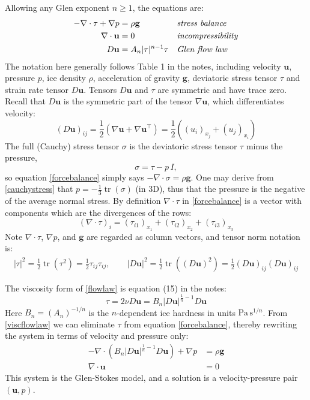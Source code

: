 \documentclass[letterpaper,final,12pt,reqno]{amsart}
\newcommand{\grad}{\nabla}
\newcommand{\Div}{\nabla\cdot}
\newcommand{\trace}{\operatorname{tr}}
\newcommand{\bg}{\mathbf{g}}
\newcommand{\bu}{\mathbf{u}}
\begin{document}
Allowing any Glen exponent $n\ge 1$, the equations are:
\begin{align}
- \nabla \cdot \tau + \nabla p &= \rho \bg &&\text{\emph{stress balance}} \label{forcebalance} \\
\nabla \cdot \bu &= 0 &&\text{\emph{incompressibility}} \label{incompressible} \\
D\bu &= A_n |\tau|^{n-1} \tau &&\text{\emph{Glen flow law}} \label{flowlaw}
\end{align}
The notation here generally follows Table 1 in the notes, including velocity $\bu$, pressure $p$, ice density $\rho$, acceleration of gravity $\bg$, deviatoric stress tensor $\tau$ and strain rate tensor $D\bu$.  Tensors $D\bu$ and $\tau$ are symmetric and have trace zero.  Recall that $D\bu$ is the symmetric part of the tensor $\grad \bu$, which differentiates velocity:
\begin{equation}
(D\bu)_{ij} = \frac{1}{2} \left(\grad\bu + \grad\bu^\top\right) = \frac{1}{2} \left((u_i)_{x_j} + (u_j)_{x_i}\right) \label{strainrate}
\end{equation}
The full (Cauchy) stress tensor $\sigma$ is the deviatoric stress tensor $\tau$ minus the pressure,
\begin{equation}
    \sigma = \tau - p\,I,  \label{cauchystress}
\end{equation}
so equation \eqref{forcebalance} simply says $-\Div \sigma = \rho \bg$.  One may derive from \eqref{cauchystress} that $p = -\frac{1}{3} \trace(\sigma)$ (in 3D), thus that the pressure is the negative of the average normal stress.  By definition $\Div\tau$ in \eqref{forcebalance} is a vector with components which are the divergences of the rows:
\begin{equation}
    \left(\nabla \cdot \tau\right)_i = \left(\tau_{i1}\right)_{x_1} + \left(\tau_{i2}\right)_{x_2} + \left(\tau_{i3}\right)_{x_3}  \label{divtaudefn}
\end{equation}
Note $\nabla\cdot \tau$, $\nabla p$, and $\bg$ are regarded as column vectors, and tensor norm notation is:
\begin{align*}
|\tau|^2 = \frac{1}{2} \trace\left(\tau^2\right) = \frac{1}{2} \tau_{ij} \tau_{ij}, \qquad |D\bu|^2 = \frac{1}{2} \trace\left((D\bu)^2\right) = \frac{1}{2} (D\bu)_{ij} (D\bu)_{ij}
\end{align*}

The viscosity form of \eqref{flowlaw} is equation (15) in the notes:
\begin{equation}
\tau = 2\nu D\bu = B_n |D\bu|^{\frac{1}{n} - 1} D\bu  \label{viscflowlaw}
\end{equation}
Here $B_n = (A_n)^{-1/n}$ is the $n$-dependent ice hardness in units $\text{Pa}\,\text{s}^{1/n}$.  From \eqref{viscflowlaw} we can eliminate $\tau$ from equation \eqref{forcebalance}, thereby rewriting the system in terms of velocity and pressure only:
\begin{align}
- \nabla \cdot \left(B_n |D\bu|^{\frac{1}{n} - 1} D\bu\right) + \nabla p &= \rho \mathbf{g} \label{stokes} \\
\Div \bu &= 0 \label{incompagain}
\end{align}
This system is the Glen-Stokes model, and a solution is a velocity-pressure pair $(\bu,p)$.
\end{document}
